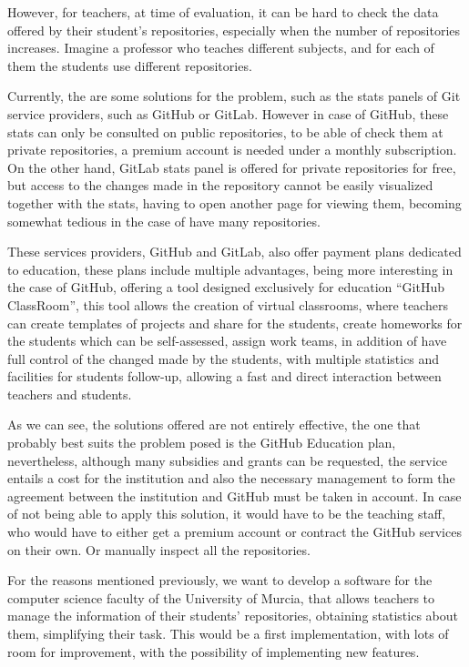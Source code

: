 However, for teachers, at time of evaluation, it can be hard to check the
data offered by their student’s repositories, especially when the number of
repositories increases. Imagine a professor who teaches different subjects,
and for each of them the students use different repositories.

Currently, the are some solutions for the problem, such as the stats panels
of Git service providers, such as GitHub\cite{GitHub} or GitLab\cite{GitLab}. However in case of
GitHub, these stats can only be consulted on public repositories, to be
able of check them at private repositories, a premium account is needed
under a monthly subscription. On the other hand, GitLab stats panel is
offered for private repositories for free, but access to the changes made
in the repository cannot be easily visualized together with the stats,
having to open another page for viewing them, becoming somewhat tedious in
the case of have many repositories.

These services providers, GitHub and GitLab, also offer payment plans
dedicated to education, these plans include multiple advantages, being more
interesting in the case of GitHub, offering a tool designed exclusively for
education “GitHub ClassRoom”, this tool allows the creation of virtual
classrooms, where teachers can create templates of projects and share for
the students, create homeworks for the students which can be self-assessed,
assign work teams, in addition of have full control of the changed made by
the students, with multiple statistics and facilities for students
follow-up, allowing a fast and direct interaction between teachers and
students.

As we can see, the solutions offered are not entirely effective, the one
that probably best suits the problem posed is the GitHub Education plan,
nevertheless, although many subsidies and grants can be requested, the
service entails a cost for the institution and also the necessary
management to form the agreement between the institution and GitHub must be
taken in account. In case of not being able to apply this solution, it
would have to be the teaching staff, who would have to either get a premium
account or contract the GitHub services on their own. Or manually inspect
all the repositories.

For the reasons mentioned previously, we want to develop a software for the
computer science faculty of the University of Murcia, that allows teachers
to manage the information of their students' repositories, obtaining
statistics about them, simplifying their task. This would be a first
implementation, with lots of room for improvement, with the possibility of
implementing new features.

